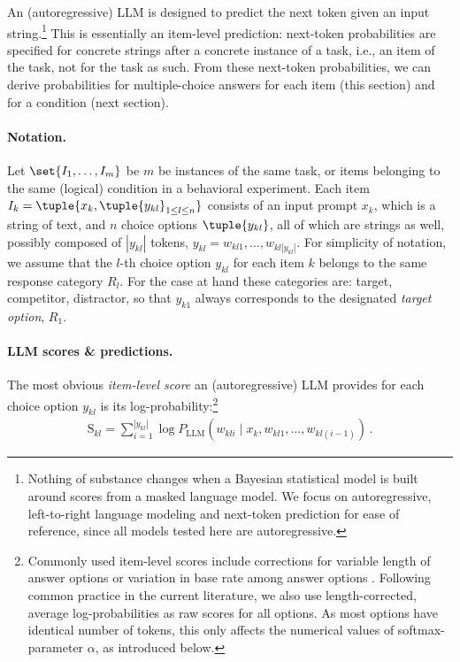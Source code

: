 \documentclass[fleqn]{article}
\begin{document}
An (autoregressive) LLM is designed to predict the next token given an input string.\footnote{
  Nothing of substance changes when a Bayesian statistical model is built around scores from a masked language model.
  We focus on autoregressive, left-to-right language modeling and next-token prediction for ease of reference, since all models tested here are autoregressive.
}
This is essentially an item-level prediction: next-token probabilities are specified for concrete strings after a concrete instance of a task, i.e., an item of the task, not for the task as such.
From these next-token probabilities, we can derive probabilities for multiple-choice answers for each item (this section) and for a condition (next section).

\paragraph{Notation.}
Let $\set{I_{1}, \dots, I_{m}}$ be $m$ be instances of the same task, or items belonging to the same (logical) condition in a behavioral experiment.
Each item $I_{k} = \tuple{x_{k}, \tuple{y_{kl}}_{1 \le l \le n}}$ consists of an input prompt $x_{k}$, which is a string of text, and $n$ choice options $\tuple{y_{kl}}$, all of which are strings as well, possibly composed of $|y_{kl}|$ tokens, $y_{kl} = w_{kl1}, \dots, w_{kl|y_{kl}|}$.
For simplicity of notation, we assume that the $l$-th choice option $y_{kl}$ for each item $k$ belongs to the same response category $R_{l}$.
For the case at hand these categories are: target, competitor, distractor, so that $y_{k1}$ always corresponds to the designated \emph{target option}, $R_{1}$.

\paragraph{LLM scores \& predictions.}
The most obvious \emph{item-level score} an (autoregressive) LLM provides for each choice option $y_{kl}$ is its log-probability:\footnote{
  Commonly used item-level scores include corrections for variable length of answer options \citep[e.g.,][]{BrownMann2020:Language-Models} or variation in base rate among answer options \citep[e.g.,][]{HoltzmanWest2021:Surface-Form-Co}.
  Following common practice in the current literature, we also use length-corrected, average log-probabilities as raw scores for all options.
  As most options have identical number of tokens, this only affects the numerical values of softmax-parameter $\alpha$, as introduced below.}
%
\begin{align*}
  \text{S}_{kl}
  =  \sum_{i=1}^{|y_{kl}|} \log P_{\text{LLM}} \left(w_{kli} \mid x_{k}, w_{kl1}, \dots, w_{kl(i-1)} \right)  \,.
\end{align*}
%
\end{document}
